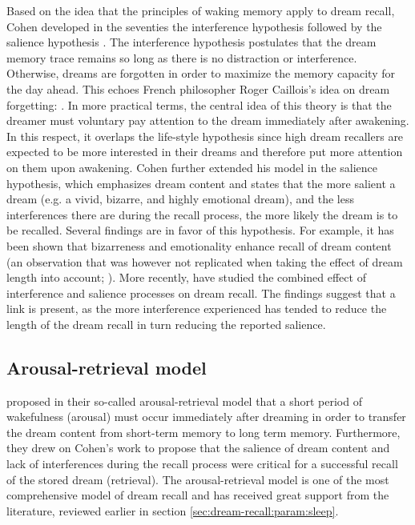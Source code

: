 Based on the idea that the principles of waking memory apply to dream recall, Cohen developed in the seventies the interference hypothesis \citep{cohen_dream_1973} followed by the salience hypothesis \citep{cohen_test_1974}. The interference hypothesis postulates that the dream memory trace remains so long as there is no distraction or interference. Otherwise, dreams are forgotten in order to maximize the memory capacity for the day ahead. This echoes French philosopher Roger Caillois’s idea on dream forgetting:  \citep{caillois_incertitude_1956}. In more practical terms, the central idea of this theory is that the dreamer must voluntary pay attention to the dream immediately after awakening. In this respect, it overlaps the life-style hypothesis since high dream recallers are expected to be more interested in their dreams and therefore put more attention on them upon awakening.
Cohen further extended his model in the salience hypothesis, which emphasizes dream content and states that the more salient a dream (e.g. a vivid, bizarre, and highly emotional dream), and the less interferences there are during the recall process, the more likely the dream is to be recalled. Several findings are in favor of this hypothesis. For example, it has been shown that bizarreness \citep{cipolli_bizarreness_1993} and emotionality \citep{schredl_emotions_1998} enhance recall of dream content (an observation that was however not replicated when taking the effect of dream length into account; \citep{schredl_relationship_2000}). More recently, \citet{parke_re-examination_2009} have studied the combined effect of interference and salience processes on dream recall. The findings suggest that a link is present, as the more interference experienced has tended to reduce the length of the dream recall in turn reducing the reported salience.

\subsection{Arousal-retrieval model}
\label{sec:dream-recall:theories:arousal}

\citet{koulack_dream_1976} proposed in their so-called arousal-retrieval model that a short period of wakefulness (arousal) must occur immediately after dreaming in order to transfer the dream content from short-term memory to long term memory. Furthermore, they drew on Cohen’s work to propose that the salience of dream content and lack of interferences during the recall process were critical for a successful recall of the stored dream (retrieval). The arousal-retrieval model is one of the most comprehensive model of dream recall and has received great support from the literature, reviewed earlier in section \ref{sec:dream-recall:param:sleep}.

